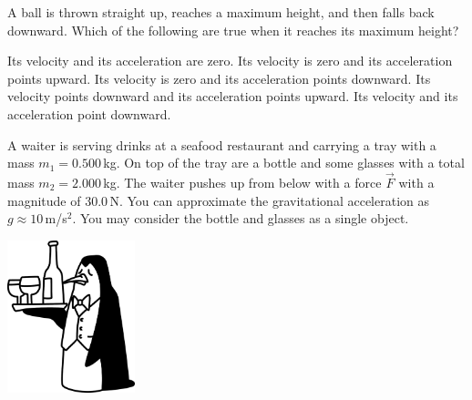 \documentclass[letterpaper,addpoints,answers]{exam}
\begin{document}
\begin{questions}
\question[5]
A ball is thrown straight up, reaches a maximum height, and then falls back downward. Which of the following are true when it reaches its maximum height?
\begin{checkboxes}
 \choice Its velocity and its acceleration are zero.
 \choice Its velocity is zero and its acceleration points upward.
 \correctchoice Its velocity is zero and its acceleration points downward.
 \choice Its velocity points downward and its acceleration points upward.
 \choice Its velocity and its acceleration point downward.
\end{checkboxes}

\pagebreak

\begin{multicols}{2}
\question
A waiter is serving drinks at a seafood restaurant and carrying a tray with a mass $m_1 = 0.500$\,kg. On top of the tray are a bottle and some glasses with a total mass $m_2 = 2.000$\,kg. The waiter pushes up from below with a force $\vec{F}$ with a magnitude of 30.0\,N. You can approximate the gravitational acceleration as $g \approx 10$\,m/s$^2$. You may consider the bottle and glasses as a single object.
\columnbreak
\begin{center}
 \includegraphics[width=10em]{illustration-of-a-penguin-waiter-serving-drinks-on-a-tray}
\end{center}
\end{multicols}
\end{questions}
\end{document}
